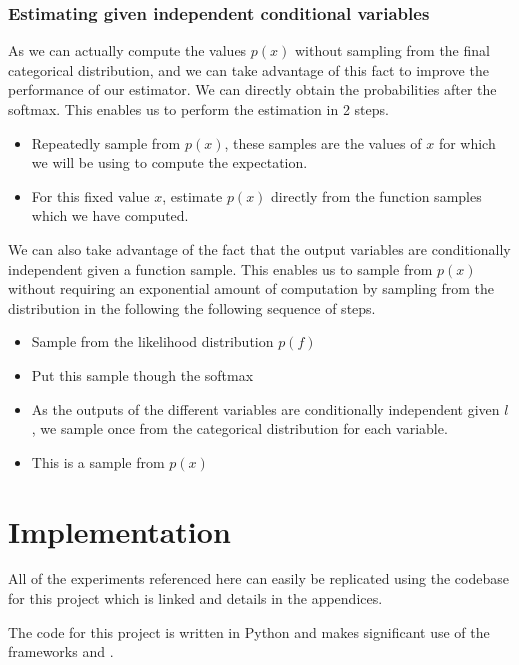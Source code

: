 \documentclass[12pt, a4paper]{report}
\theoremstyle{definition}
\theoremstyle{definition}
\theoremstyle{definition}
\begin{document}
\subsection{Estimating given independent conditional variables}

As we can actually compute the values $p(x)$ without sampling from the final categorical distribution, and we can take advantage of this fact to improve the performance of our estimator. We can directly obtain the probabilities after the softmax. This enables us to perform the estimation in 2 steps.

\begin{itemize}
    \item Repeatedly sample from $p(x)$, these samples are the values of $x$ for which we will be using to compute the expectation.
    \item For this fixed value $x$, estimate $p(x)$ directly from the function samples which we have computed.
\end{itemize}

We can also take advantage of the fact that the output variables are conditionally independent given a function sample. This enables us to sample from $p(x)$ without requiring an exponential amount of computation by sampling from the distribution in the following the following sequence of steps.

\begin{itemize}
    \item Sample from the likelihood distribution $p(f)$
    \item Put this sample though the softmax
    \item As the outputs of the different variables are conditionally independent given $l$, we sample once from the categorical distribution for each variable.
    \item This is a sample from $p(x)$
\end{itemize}


\chapter{Implementation}
\label{sec:Implementaion}

All of the experiments referenced here can easily be replicated using the codebase for this project which is linked and details in the appendices.

The code for this project is written in Python and makes significant use of the frameworks \cite[Pytorch]{NEURIPS2019_9015} and \cite[GPytorch]{gardner2018gpytorch}.
\end{document}
